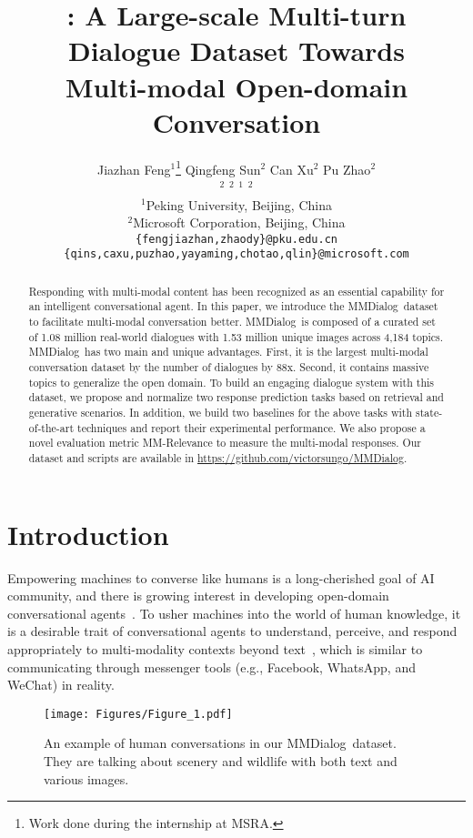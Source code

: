 \documentclass[11pt]{article}
\title{\DataName: A Large-scale Multi-turn Dialogue Dataset Towards \\ Multi-modal Open-domain Conversation}
\author{Jiazhan Feng$^1$\thanks{\quad Work done during the internship at MSRA.} \quad Qingfeng Sun$^2$ \quad  Can Xu$^2$  \quad Pu Zhao$^2$\\ \quad {\bf Yaming Yang}$^2$ \quad {\bf Chongyang Tao}$^2$ \quad {\bf Dongyan Zhao}$^1$  \quad {\bf Qingwei Lin}$^2$  \\
      $^1$Peking University, Beijing, China \\ $^2$Microsoft Corporation, Beijing, China\\ 
      \texttt{\{fengjiazhan,zhaody\}@pku.edu.cn}\\
      \texttt{\{qins,caxu,puzhao,yayaming,chotao,qlin\}@microsoft.com}}
\newcommand{\DataName}{MMDialog}
\begin{document}
\maketitle

\begin{abstract}

Responding with multi-modal content has been recognized as an essential capability for an intelligent conversational agent. In this paper, we introduce the \DataName~dataset to facilitate multi-modal conversation better. \DataName~is composed of a curated set of 1.08 million real-world dialogues with 1.53 million unique images across 4,184 topics. \DataName~has two main and unique advantages. First, it is the largest multi-modal conversation dataset by the number of dialogues by 88x. Second, it contains massive topics to generalize the open domain. To build an engaging dialogue system with this dataset, we propose and normalize two response prediction tasks based on retrieval and generative scenarios. In addition, we build two baselines for the above tasks with state-of-the-art techniques and report their experimental performance. We also propose a novel evaluation metric MM-Relevance to measure the multi-modal responses. Our dataset and scripts are available in \url{https://github.com/victorsungo/MMDialog}.



 \end{abstract}

\section{Introduction}



Empowering machines to converse like humans is a long-cherished goal of AI community, and there is growing interest in developing open-domain conversational agents~\cite{li-etal-2017-adversarial,gao2018neural,ghazvininejad2018knowledge,zhou2018emotional}. To usher machines into the world of human knowledge, it is a desirable trait of conversational agents to understand, perceive, and respond appropriately to multi-modality contexts beyond text~\cite{das2017visual,mostafazadeh-etal-2017-image,shuster-etal-2020-image}, which is similar to communicating through messenger tools (e.g., Facebook, WhatsApp, and WeChat) in reality.


\begin{figure}[!htb]
\centering
     \texttt{[image: Figures/Figure\_1.pdf]}
     \caption{An example of human conversations in our \DataName~dataset. They are talking about scenery and wildlife with both text and various images.}
     \label{fig:intro_case}
\end{figure}
\end{document}
